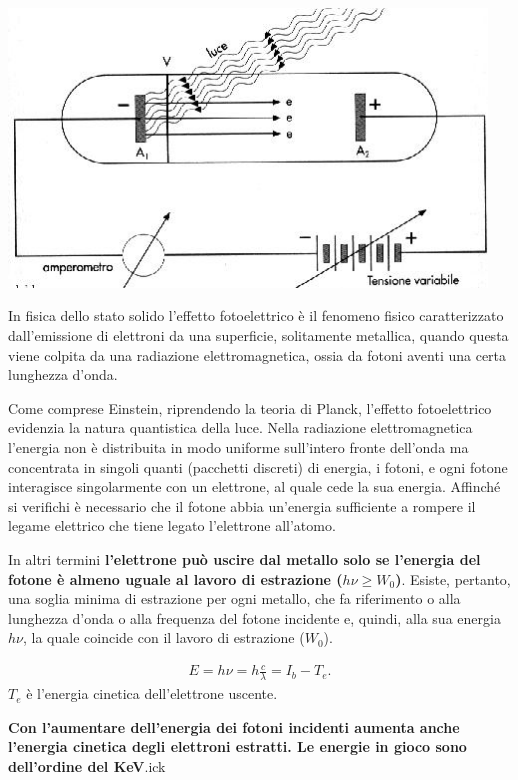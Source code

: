 \documentclass[a4paper,11pt,twoside,openany]{book}
\theoremstyle{definition}
\theoremstyle{plain}
\theoremstyle{plain}
\theoremstyle{definition}
\begin{document}
\begin{center}
\includegraphics[width=5in]{immagini/photoelectric.jpg} %
\end{center}

In fisica dello stato solido l'effetto fotoelettrico è il fenomeno fisico caratterizzato dall'emissione di elettroni da una superficie, solitamente metallica, quando questa viene colpita da una radiazione elettromagnetica, ossia da fotoni aventi una certa lunghezza d'onda.

Come comprese Einstein, riprendendo la teoria di Planck, l’effetto fotoelettrico evidenzia la natura quantistica della luce. Nella radiazione elettromagnetica l’energia non è distribuita in modo uniforme sull’intero fronte dell’onda ma concentrata in singoli quanti (pacchetti discreti) di energia, i fotoni, e ogni fotone interagisce singolarmente con un elettrone, al quale cede la sua energia. Affinché si verifichi è necessario che il fotone abbia un’energia sufficiente a rompere il legame elettrico che tiene legato l’elettrone all’atomo.

In altri termini \textbf{l’elettrone può uscire dal metallo solo se l’energia del fotone è almeno uguale al lavoro di estrazione ($h\nu \ge W_0$)}. Esiste, pertanto, una soglia minima di estrazione per ogni metallo, che fa riferimento o alla lunghezza d’onda o alla frequenza del fotone incidente e, quindi, alla sua energia $h\nu$, la quale coincide con il lavoro di estrazione ($W_0$).

\begin{equation}\begin{split}
E=h\nu=h\frac{c}{\lambda}=I_b-T_e.
\end{split}\end{equation}
$T_e$ è l'energia cinetica dell'elettrone uscente.

\textbf{Con l’aumentare dell’energia dei fotoni incidenti aumenta anche l’energia cinetica degli elettroni estratti. Le energie in gioco sono dell'ordine del KeV}.ick
\end{document}
